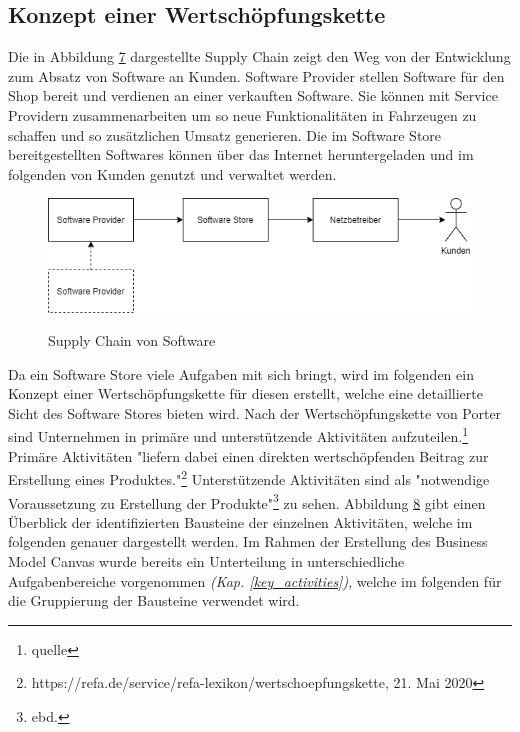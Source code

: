 \subsection{Konzept einer Wertschöpfungskette}\label{wsk}
Die in Abbildung \hyperref[img:supplychain]{7} dargestellte Supply Chain zeigt den Weg von der Entwicklung zum Absatz von Software an Kunden. Software Provider stellen Software für den Shop bereit und verdienen an einer verkauften Software. Sie können mit Service Providern zusammenarbeiten um so neue Funktionalitäten in Fahrzeugen zu schaffen und so zusätzlichen Umsatz generieren. Die im Software Store bereitgestellten Softwares können über das Internet heruntergeladen und im folgenden von Kunden genutzt und verwaltet werden.
\begin{figure}[!h]
	\centering
	\includegraphics[width=0.8\columnwidth]{pictures/supplychain.png}
	\label{img:supplychain}
	\caption{Supply Chain von Software}
\end{figure}
Da ein Software Store viele Aufgaben mit sich bringt, wird im folgenden ein Konzept einer Wertschöpfungskette für diesen erstellt, welche eine detaillierte Sicht des Software Stores bieten wird. Nach der Wertschöpfungskette von Porter sind Unternehmen in primäre und unterstützende Aktivitäten aufzuteilen.\footnote{quelle} Primäre Aktivitäten "liefern dabei einen direkten wertschöpfenden Beitrag zur Erstellung eines Produktes."\footnote{https://refa.de/service/refa-lexikon/wertschoepfungskette, 21. Mai 2020} Unterstützende Aktivitäten sind als "notwendige Voraussetzung zu Erstellung der Produkte"\footnote{ebd.} zu sehen. Abbildung \hyperref[img:wsk]{8} gibt einen Überblick der identifizierten Bausteine der einzelnen Aktivitäten, welche im folgenden genauer dargestellt werden. Im Rahmen der Erstellung des Business Model Canvas wurde bereits ein Unterteilung in unterschiedliche Aufgabenbereiche vorgenommen \textit{(Kap. \ref{key_activities})}, welche im folgenden für die Gruppierung der Bausteine verwendet wird.
